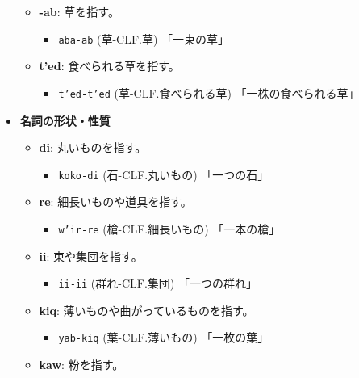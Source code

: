 \begin{itemize}
\begin{itemize}
\begin{itemize}
                \end{itemize}
            \item \textbf{-ab}: 草を指す。
                \begin{itemize}
                    \item \texttt{aba-ab} (草-CLF.草) %
                    \quad 「一束の草」
                \end{itemize}
            \item \textbf{t'ed}: 食べられる草を指す。%
                \begin{itemize}
                    \item \texttt{t'ed-t'ed} (草-CLF.食べられる草) %
                    \quad 「一株の食べられる草」
                \end{itemize}
        \end{itemize}
    \item \textbf{名詞の形状・性質}
        \begin{itemize}
            \item \textbf{di}: 丸いものを指す。
                \begin{itemize}
                    \item \texttt{koko-di} (石-CLF.丸いもの) %
                    \quad 「一つの石」
                \end{itemize}
            \item \textbf{re}: 細長いものや道具を指す。
                \begin{itemize}
                    \item \texttt{w'ir-re} (槍-CLF.細長いもの) %
                    \quad 「一本の槍」
                \end{itemize}
            \item \textbf{ii}: 束や集団を指す。
                \begin{itemize}
                    \item \texttt{ii-ii} (群れ-CLF.集団) %
                    \quad 「一つの群れ」
                \end{itemize}
            \item \textbf{kiq}: 薄いものや曲がっているものを指す。
                \begin{itemize}
                    \item \texttt{yab-kiq} (葉-CLF.薄いもの) %
                    \quad 「一枚の葉」
                \end{itemize}
            \item \textbf{kaw}: 粉を指す。

\end{itemize}
\end{itemize}
